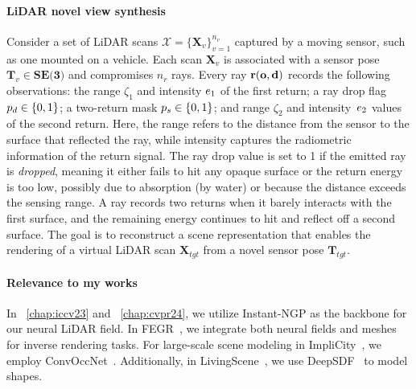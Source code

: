 \paragraph{LiDAR novel view synthesis}
Consider a set of LiDAR scans $\mathcal{X} = \{\mathbf{X}_v\}_{v=1}^{n_v}$ captured by a moving sensor, such as one mounted on a vehicle. Each scan $\mathbf{X}_v$ is associated with a sensor pose $\mathbf{T}_v \in \textbf{SE(3)}$ and compromises $n_r$ rays. Every ray $\mathbf{r}(\mathbf{o}, \mathbf{d})$ records the following observations: the range $\zeta_1$ and intensity $e_1$ of the first return; a ray drop flag $p_d \in \{0, 1\}$; a two-return mask $p_s \in \{0,1\}$; and range $\zeta_2$ and intensity~$e_2$ values of the second return. Here, the range refers to the distance from the sensor to the surface that reflected the ray, while intensity captures the radiometric information of the return signal. The ray drop value is set to 1 if the emitted ray is \textit{dropped}, meaning it either fails to hit any opaque surface or the return energy is too low, possibly due to absorption (\eg by water) or because the distance exceeds the sensing range. A ray records two returns when it barely interacts with the first surface, and the remaining energy continues to hit and reflect off a second surface. The goal is to reconstruct a scene representation that enables the rendering of a virtual LiDAR scan $\mathbf{X}_{tgt}$ from a novel sensor pose $\mathbf{T}_{tgt}$.



\paragraph{Relevance to my works} In ~\cref{chap:iccv23} and ~\cref{chap:cvpr24}, we utilize Instant-NGP as the backbone for our neural LiDAR field. In FEGR~\cite{wang2023neural}, we integrate both neural fields and meshes for inverse rendering tasks. For large-scale scene modeling in ImpliCity~\cite{stucker2022implicity}, we employ ConvOccNet~\cite{peng2020convolutional}. Additionally, in LivingScene~\cite{zhu2023living}, we use DeepSDF~\cite{park2019deepsdf} to model shapes.


